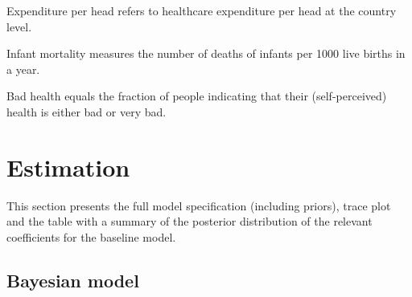 \documentclass[a4paper,12pt]{article}
\begin{document}
Expenditure per head refers to healthcare expenditure per head at the country level.


Infant mortality measures the number of deaths of infants per 1000 live births in a year.

Bad health equals the fraction of people indicating that their (self-perceived) health is either bad or very bad.


\section{Estimation}
\label{sec:orgb3ec11c}
\label{sec:estimation_appendix}

This section presents the full model specification (including priors), trace plot and the table with a summary of the posterior distribution of the relevant coefficients for the baseline model. 

\subsection{Bayesian model}
\label{sec:orge23dd1f}
\label{sec:Bayesian_model}
\end{document}
